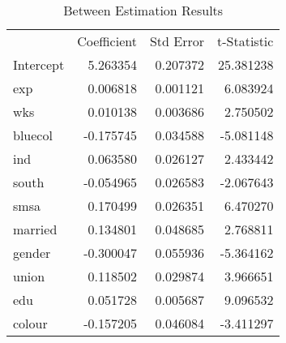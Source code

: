 \begin{table}[h]\centering
\begin{tabular}{lrrr}
 & Coefficient & Std Error & t-Statistic \\
Intercept & 5.263354 & 0.207372 & 25.381238 \\
exp & 0.006818 & 0.001121 & 6.083924 \\
wks & 0.010138 & 0.003686 & 2.750502 \\
bluecol & -0.175745 & 0.034588 & -5.081148 \\
ind & 0.063580 & 0.026127 & 2.433442 \\
south & -0.054965 & 0.026583 & -2.067643 \\
smsa & 0.170499 & 0.026351 & 6.470270 \\
married & 0.134801 & 0.048685 & 2.768811 \\
gender & -0.300047 & 0.055936 & -5.364162 \\
union & 0.118502 & 0.029874 & 3.966651 \\
edu & 0.051728 & 0.005687 & 9.096532 \\
colour & -0.157205 & 0.046084 & -3.411297 \\
\end{tabular}

\caption{Between Estimation Results}
\label{tab:between_estimation}
\end{table}

